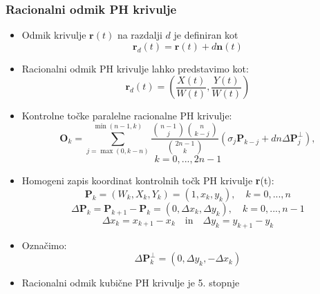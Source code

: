 \documentclass[12pt]{beamer}
\theoremstyle{definition} %
\theoremstyle{plain} %
\begin{document}
\begin{frame}
    \frametitle{Racionalni odmik PH krivulje}
        \begin{itemize}
            \item Odmik krivulje $\textbf{r}(t)$ na razdalji $d$ je definiran kot 
                  $$\textbf{r}_d(t) = \textbf{r}(t) + d \textbf{n}(t)$$
            \item Racionalni odmik PH krivulje lahko predstavimo kot:
                  $$ \textbf{r}_d(t) = \left(\frac{X(t)}{W(t)}, \frac{Y(t)}{W(t)}\right)$$ 
            \item Kontrolne točke paralelne racionalne PH krivulje:
                  $$\textbf{O}_k = \sum_{j=\max(0, k-n)}^{\min(n-1, k)} \frac{\binom{n-1}{j} \binom{n}{k-j}}{\binom{2n-1}{k}}(\sigma_j \textbf{P}_{k-j}+ d n \Delta\textbf{P}^\perp_j),$$ 
                  $$k=0, ..., 2n-1$$
        \end{itemize}

    \end{frame}
    \begin{frame}
        \begin{itemize}
            \item Homogeni zapis koordinat kontrolnih točk PH krivulje \textbf{r}(t):
                  $$ \textbf{P}_k = (W_k, X_k, Y_k) = (1, x_k, y_k), \quad k = 0, ..., n$$
                  $$\Delta \textbf{P}_k = \textbf{P}_{k+1}-\textbf{P}_k = (0, \Delta x_k, \Delta y_k), \quad k = 0, ..., n-1$$ 
                  $$\Delta x_k = x_{k+1} - x_k \quad \text{in} \quad \Delta y_k = y_{k+1} - y_k$$
            \item Označimo:
            $$ \Delta \textbf{P}_k^{\perp} = (0, \Delta y_k, - \Delta x_k)$$
            \item Racionalni odmik kubične PH krivulje je 5. stopnje
            
        \end{itemize}
    \end{frame}
    
\end{document}
